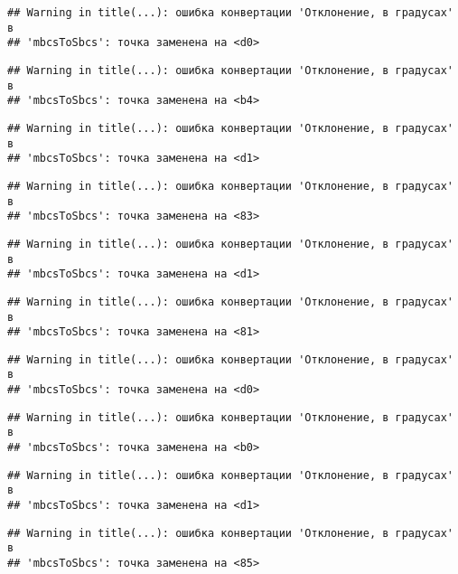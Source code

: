 \documentclass[
]{article}
\begin{document}
\begin{verbatim}
## Warning in title(...): ошибка конвертации 'Отклонение, в градусах' в
## 'mbcsToSbcs': точка заменена на <d0>
\end{verbatim}

\begin{verbatim}
## Warning in title(...): ошибка конвертации 'Отклонение, в градусах' в
## 'mbcsToSbcs': точка заменена на <b4>
\end{verbatim}

\begin{verbatim}
## Warning in title(...): ошибка конвертации 'Отклонение, в градусах' в
## 'mbcsToSbcs': точка заменена на <d1>
\end{verbatim}

\begin{verbatim}
## Warning in title(...): ошибка конвертации 'Отклонение, в градусах' в
## 'mbcsToSbcs': точка заменена на <83>
\end{verbatim}

\begin{verbatim}
## Warning in title(...): ошибка конвертации 'Отклонение, в градусах' в
## 'mbcsToSbcs': точка заменена на <d1>
\end{verbatim}

\begin{verbatim}
## Warning in title(...): ошибка конвертации 'Отклонение, в градусах' в
## 'mbcsToSbcs': точка заменена на <81>
\end{verbatim}

\begin{verbatim}
## Warning in title(...): ошибка конвертации 'Отклонение, в градусах' в
## 'mbcsToSbcs': точка заменена на <d0>
\end{verbatim}

\begin{verbatim}
## Warning in title(...): ошибка конвертации 'Отклонение, в градусах' в
## 'mbcsToSbcs': точка заменена на <b0>
\end{verbatim}

\begin{verbatim}
## Warning in title(...): ошибка конвертации 'Отклонение, в градусах' в
## 'mbcsToSbcs': точка заменена на <d1>
\end{verbatim}

\begin{verbatim}
## Warning in title(...): ошибка конвертации 'Отклонение, в градусах' в
## 'mbcsToSbcs': точка заменена на <85>
\end{verbatim}
\end{document}
